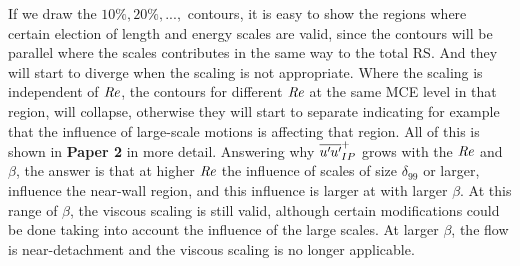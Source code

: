 If we draw the $10\%, 20\%,...,$ contours, it is easy to show the regions where certain election of length and energy scales are valid, since the contours will be parallel where the scales contributes in the same way to the total RS. And they will start to diverge when the scaling is not appropriate.
Where the scaling is independent of $\mbox{\textit{Re}}$, the contours for different $\mbox{\textit{Re}}$ at the same MCE level in that region, will collapse, otherwise they will start to separate indicating for example that the influence of large-scale motions is affecting that region.
All of this is shown in \textbf{Paper 2} in more detail.
Answering why $\overline{u^{\prime}\mkern-1.2mu u^{\prime}\mkern-1.2mu}_{IP}^+$ grows with the $\mbox{\textit{Re}}$ and $\beta$, the answer is that at higher $\mbox{\textit{Re}}$ the influence of scales of size $\delta_{99}$ or larger, influence the near-wall region, and this influence is larger at with larger $\beta$. At this range of $\beta$, the viscous scaling is still valid, although certain modifications could be done taking into account the influence of the large scales.
At larger $\beta$, the flow is near-detachment and the viscous scaling is no longer applicable.




